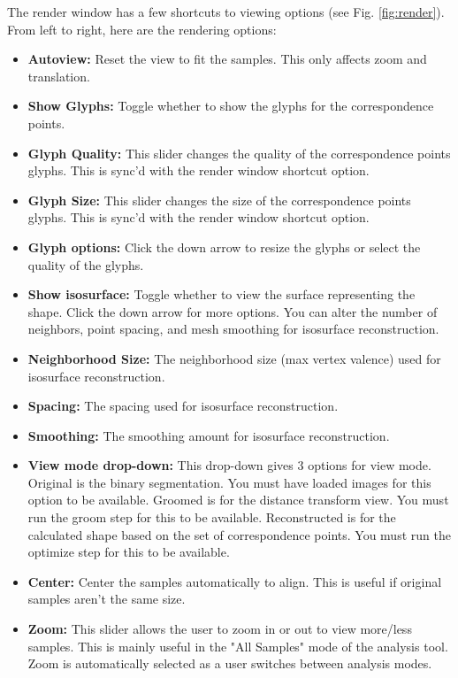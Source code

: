 \documentclass[letterpaper,12pt]{article}   %
\begin{document}
The render window has a few shortcuts to viewing options (see Fig. \ref{fig:render}). From left to right, here are the rendering options:

\begin{itemize}

\item \textbf{Autoview:} Reset the view to fit the samples. This only affects zoom and translation.

\item \textbf{Show Glyphs:} Toggle whether to show the glyphs for the correspondence points.

\item \textbf{Glyph Quality:} This slider changes the quality of the correspondence points glyphs. This is sync'd with the render window shortcut option.

\item \textbf{Glyph Size:} This slider changes the size of the correspondence points glyphs. This is sync'd with the render window shortcut option.

\item \textbf{Glyph options:} Click the down arrow to resize the glyphs or select the quality of the glyphs.

\item \textbf{Show isosurface:} Toggle whether to view the surface representing the shape. Click the down arrow for more options. You can alter the number of neighbors, point spacing, and mesh smoothing for isosurface reconstruction.

\item \textbf{Neighborhood Size:} The neighborhood size (max vertex valence) used for isosurface reconstruction.

\item \textbf{Spacing:} The spacing used for isosurface reconstruction.

\item \textbf{Smoothing:} The smoothing amount for isosurface reconstruction.

\item \textbf{View mode drop-down:} This drop-down gives 3 options for view mode. Original is the binary segmentation. You must have loaded images for this option to be available. Groomed is for the distance transform view. You must
run the groom step for this to be available. Reconstructed is for the calculated shape based on the set of correspondence points. You must run the optimize step for this to be available.

\item \textbf{Center:} Center the samples automatically to align. This is useful if original samples aren't the same size.

\item \textbf{Zoom:} This slider allows the user to zoom in or out to view more/less samples. This is mainly useful in the "All Samples" mode of the analysis tool. Zoom is automatically selected as a user switches between analysis modes.

\end{itemize}
\end{document}
